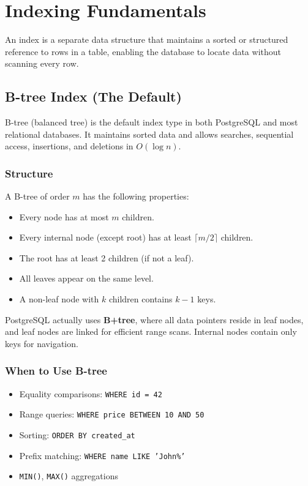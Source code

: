 \documentclass[12pt,a4paper]{article}
\begin{document}
\section{Indexing Fundamentals}

An index is a separate data structure that maintains a sorted or structured reference to rows in a table, enabling the database to locate data without scanning every row.

\subsection{B-tree Index (The Default)}

B-tree (balanced tree) is the default index type in both PostgreSQL and most relational databases. It maintains sorted data and allows searches, sequential access, insertions, and deletions in $O(\log n)$.

\subsubsection{Structure}

A B-tree of order $m$ has the following properties:
\begin{itemize}
    \item Every node has at most $m$ children.
    \item Every internal node (except root) has at least $\lceil m/2 \rceil$ children.
    \item The root has at least 2 children (if not a leaf).
    \item All leaves appear on the same level.
    \item A non-leaf node with $k$ children contains $k-1$ keys.
\end{itemize}

\begin{infobox}
PostgreSQL actually uses \textbf{B+tree}, where all data pointers reside in leaf nodes, and leaf nodes are linked for efficient range scans. Internal nodes contain only keys for navigation.
\end{infobox}

\subsubsection{When to Use B-tree}
\begin{itemize}
    \item Equality comparisons: \texttt{WHERE id = 42}
    \item Range queries: \texttt{WHERE price BETWEEN 10 AND 50}
    \item Sorting: \texttt{ORDER BY created\_at}
    \item Prefix matching: \texttt{WHERE name LIKE 'John\%'}
    \item \texttt{MIN()}, \texttt{MAX()} aggregations
\end{itemize}
\end{document}
